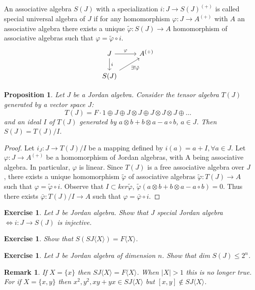 \documentclass{article}
\newtheorem{proposition}[theorem]{Proposition}
\newtheorem{remark}[theorem]{Remark}
\newtheorem{exercise}[theorem]{Exercise}
\begin{document}
\begin{definition}   
An associative algebra $S(J)$ with a specialization $i: J \to S(J)^{(+)}$ is called special universal algebra of $J$ if for any homomorphism $\varphi: J \to A^{(+)}$ with $A$ an associative algebra there exists a unique $\tilde{\varphi}: S(J) \to A$ homomorphism of associative algebras such that $\varphi = \tilde{\varphi} \circ i$.  
\[  
\begin{tikzcd}  
J \arrow[r, "\varphi"] \arrow[d, "i"] & A^{(+)} \\
S(J) \arrow[ru, "\exists ! \tilde{\varphi}"'] &  
\end{tikzcd}  
\]  
\end{definition}
\begin{proposition} Let $J$ be a Jordan algebra. Consider the tensor algebra $T(J)$ generated by a vector space $J$:  
\[  
T(J) = F \cdot 1 \oplus J \oplus J \otimes J \oplus J \otimes J \otimes J \oplus \dots  
\]  
and an ideal $I$ of $T(J)$ generated by $a \otimes b+b\otimes a - a \circ b$, $a \in J$.  
Then $S(J) = T(J)/I$.  
\end{proposition}

\begin{proof} 
Let $i_J : J \to T(J)/I$ be a mapping defined by $i(a) = a+I, \forall a \in J$. Let $\varphi: J \to A^{(+)}$ be a homomorphism of Jordan algebras, with A being associative algebra. In particular, $\varphi$ is linear. Since $T(J)$ is a free associative algebra over $J$, there exists a unique homomorphism $\tilde{\varphi}$ of associative algebras $\tilde{\varphi}: T(J) \to A$ such that $\varphi = \tilde{\varphi} \circ i$. Observe that $I \subset ker \tilde{\varphi}$, $\tilde{\varphi}(a \otimes b+b\otimes a - a \circ b) = 0$. Thus there exists $\bar{\varphi}: T(J)/I \to A$ such that $\varphi = \bar{\varphi} \circ i$.  
\end{proof}

\begin{exercise}
    Let $J$ be Jordan algebra. Show that $J$ special Jordan algebra $\Leftrightarrow i: J \to S(J)$ is injective.  
\end{exercise}
\begin{exercise}
    Show that $S(SJ\langle X \rangle) = F\langle X \rangle$.  
\end{exercise}
\begin{exercise}
    Let $J$ be Jordan algebra of dimension $n$. Show that dim $S(J) \leq 2^n$.  
\end{exercise}
\begin{remark}If $X = \{x\}$ then $SJ\langle X \rangle = F\langle X \rangle$. When $|X| > 1$ this is no longer true. For if $X = \{x, y\}$ then $x^2, y^2, xy+yx \in SJ\langle X \rangle$ but $[x,y] \notin SJ\langle X \rangle$.  
\end{remark}
\end{document}
